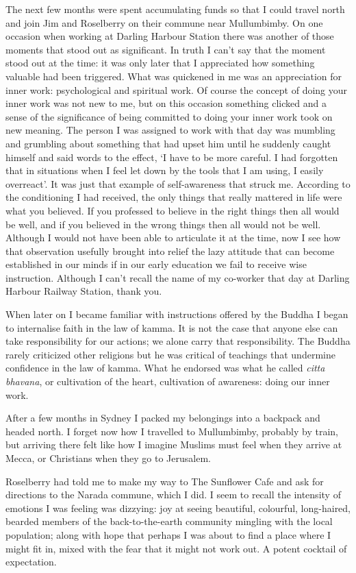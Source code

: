 The next few months were spent accumulating funds so that I could
travel north and join Jim and Roselberry on their commune near
Mullumbimby. On one occasion when working at Darling Harbour Station
there was another of those moments that stood out as significant. In
truth I can't say that the moment stood out at the time: it was only
later that I appreciated how something valuable had been triggered. What
was quickened in me was an appreciation for inner work: psychological
and spiritual work. Of course the concept of doing your inner work was
not new to me, but on this occasion something clicked and a sense of the
significance of being committed to doing your inner work took on new
meaning. The person I was assigned to work with that day was mumbling
and grumbling about something that had upset him until he suddenly
caught himself and said words to the effect, `I have to be more careful.
I had forgotten that in situations when I feel let down by the tools
that I am using, I easily overreact'. It was just that example of
self-awareness that struck me. According to the conditioning I had
received, the only things that really mattered in life were what you
believed. If you professed to believe in the right things then all would
be well, and if you believed in the wrong things then all would not be
well. Although I would not have been able to articulate it at the time,
now I see how that observation usefully brought into relief the lazy
attitude that can become established in our minds if in our early
education we fail to receive wise instruction. Although I can't recall
the name of my co-worker that day at Darling Harbour Railway Station,
thank you.

When later on I became familiar with instructions offered by the Buddha
I began to internalise faith in the law of kamma. It is not the case
that anyone else can take responsibility for our actions; we alone carry
that responsibility. The Buddha rarely criticized other religions but he
was critical of teachings that undermine confidence in the law of kamma.
What he endorsed was what he called \emph{citta bhavana}, or cultivation
of the heart, cultivation of awareness: doing our inner work.

After a few months in Sydney I packed my belongings into a backpack and
headed north. I forget now how I travelled to Mullumbimby, probably by
train, but arriving there felt like how I imagine Muslims must feel when
they arrive at Mecca, or Christians when they go to Jerusalem.

Roselberry had told me to make my way to The Sunflower Cafe and ask for
directions to the Narada commune, which I did. I seem to recall the intensity of emotions
I was feeling was dizzying: joy at seeing beautiful, colourful,
long-haired, bearded members of the back-to-the-earth community mingling
with the local population; along with hope that perhaps I was about to
find a place where I might fit in, mixed with the fear that it might not
work out. A potent cocktail of expectation.

